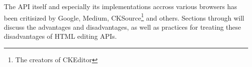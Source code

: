 The API itself and especially its implementations accross various browsers has been critisized by Google\cite{bw}, Medium\cite{medium_ce_terrible}, CKSource\cite{bj}\footnote{The creators of CKEditor} and others. Sections  through  will discuss the advantages and disadvantages, as well as practices for treating these disadvantages of HTML editing APIs.










